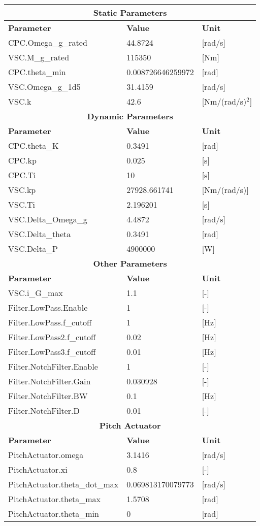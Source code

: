 \begin{longtable}{|l|l|l|}
	\hline
	\multicolumn{3}{|c|}{\textbf{Static Parameters}} \\ \hline
	\textbf{Parameter} & \textbf{Value} & \textbf{Unit}\\ \hline
	CPC.Omega\_g\_rated & 44.8724 & [rad/s]\\
	VSC.M\_g\_rated & 115350 & [Nm]\\
	CPC.theta\_min & 0.008726646259972 & [rad] \\
	VSC.Omega\_g\_1d5 & 31.4159 & [rad/s]\\
	VSC.k & 42.6 & [Nm/(rad/s)$^2$]\\\hline
	\multicolumn{3}{|c|}{\textbf{Dynamic Parameters}} \\ \hline
	\textbf{Parameter} & \textbf{Value} & \textbf{Unit}\\ \hline
	CPC.theta\_K & 0.3491 & [rad]\\
	CPC.kp & 0.025 & [s]\\
	CPC.Ti & 10 & [s]\\
	VSC.kp & 27928.661741 & [Nm/(rad/s)]\\
	VSC.Ti & 2.196201 & [s]\\
	VSC.Delta\_Omega\_g & 4.4872 & [rad/s]\\
	VSC.Delta\_theta & 0.3491 & [rad]\\
	VSC.Delta\_P & 4900000 & [W]\\\hline
	\multicolumn{3}{|c|}{\textbf{Other Parameters}} \\ \hline
	\textbf{Parameter} & \textbf{Value} & \textbf{Unit}\\ \hline
	VSC.i\_G\_max & 1.1 & [-]\\
	Filter.LowPass.Enable & 1 & [-]\\
	Filter.LowPass.f\_cutoff & 1 & [Hz]\\
	Filter.LowPass2.f\_cutoff & 0.02 & [Hz]\\
	Filter.LowPass3.f\_cutoff & 0.01 & [Hz]\\
	Filter.NotchFilter.Enable & 1 & [-]\\
	Filter.NotchFilter.Gain & 0.030928 & [-]\\
	Filter.NotchFilter.BW & 0.1 & [Hz]\\
	Filter.NotchFilter.D & 0.01 & [-]\\\hline
	\multicolumn{3}{|c|}{\textbf{Pitch Actuator}} \\ \hline
	\textbf{Parameter} & \textbf{Value} & \textbf{Unit}\\ \hline
	PitchActuator.omega & 3.1416 & [rad/s]\\
	PitchActuator.xi & 0.8 & [-]\\
	PitchActuator.theta\_dot\_max & 0.069813170079773 & [rad/s]\\
	PitchActuator.theta\_max & 1.5708 & [rad]\\
	PitchActuator.theta\_min & 0 & [rad]\\\hline
\end{longtable}
